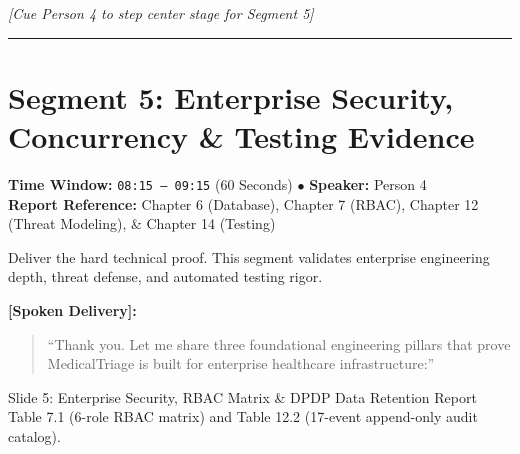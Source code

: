 \documentclass[11pt,a4paper]{article}
\begin{document}
\noindent \textit{[Cue Person 4 to step center stage for Segment 5]}

\vspace{4mm}
\hrule
\vspace{6mm}

\section{Segment 5: Enterprise Security, Concurrency \& Testing Evidence}
\noindent \textbf{Time Window:} \texttt{08:15 -- 09:15} (60 Seconds) \quad $\bullet$ \quad \textbf{Speaker:} Person 4\\
\textbf{Report Reference:} Chapter 6 (Database), Chapter 7 (RBAC), Chapter 12 (Threat Modeling), \& Chapter 14 (Testing)

\begin{stagenote}
Deliver the hard technical proof. This segment validates enterprise engineering depth, threat defense, and automated testing rigor.
\end{stagenote}

\vspace{1mm}
\noindent \textbf{[Spoken Delivery]:}
\begin{quote}
``Thank you. Let me share three foundational engineering pillars that prove MedicalTriage is built for enterprise healthcare infrastructure:''
\end{quote}

\begin{slidebox}{Slide 5: Enterprise Security, RBAC Matrix \& DPDP Data Retention}
Report Table 7.1 (6-role RBAC matrix) and Table 12.2 (17-event append-only audit catalog).
\end{slidebox}
\end{document}

